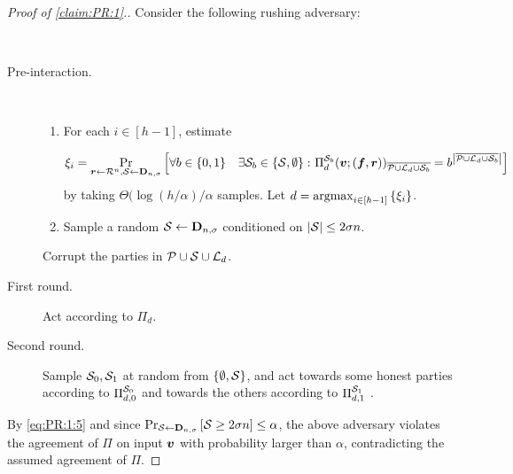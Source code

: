 \begin{proof}[Proof of \cref{claim:PR:1}.]
{\samepage
\noindent
Consider the following rushing adversary:

\begin{algorithm}[$\Ac$]~

\begin{description}
\item[Pre-interaction.] ~
		
	\begin{enumerate}
		\item For each $i\in [h-1]$, estimate
		
		\[
        \xi_i = \Pr_{{ \boldsymbol{r}}\gets \mathcal{R}^n,\mathcal{S} \gets \mathbf{D}_{n,\sigma}}\left[\forall b\in \{0,1\} \quad \exists {\cal{S}}_b \in \left\{{\cal{S}},\emptyset\right\} \colon \Pi^{{\cal{S}}_b}_{d}({ \boldsymbol{v}};({ \boldsymbol{f}},{ \boldsymbol{r}}))_{\overline{ \mathcal{P} \cup {\cal{L}}_d \cup {\cal{S}}_b}}= b^{ \left|\overline{ \mathcal{P} \cup {\cal{L}}_d \cup {\cal{S}}_b}\right|}\right]
         \]
         by taking $\Theta(\log (h/\alpha)/\alpha$ samples. Let $d = \operatorname*{argmax}_{i\in [h-1]}\left\{\xi_i\right\}$.
		
		\item Sample a random $\mathcal{S} \gets \mathbf{D}_{n,\sigma} $ conditioned on $\left|{\cal{S}}\right| \le 2\sigma n$.
	\end{enumerate}
	
	 Corrupt the parties in $\mathcal{P} \cup \mathcal{S}\cup {\cal{L}}_d$.
	
	\item[First round.] Act according to $\Pi_d$.
	
	\item[Second round.] Sample ${\cal{S}}_0,{\cal{S}}_1$ at random from $\left\{\emptyset,{\cal{S}}\right\}$, and act towards some honest parties according to $\Pi^{{\cal{S}}_0}_{d,0}$ and towards the others according to $\Pi^{{\cal{S}}_1}_{d,1}$ .
\end{description}
\end{algorithm}
}
By \cref{eq:PR:1:5} and since $\Pr_{{\cal{S}} \gets \mathbf{D}_{n,\sigma}}\left[{\cal{S}} \ge 2\sigma n\right] \le \alpha$, the above adversary violates the agreement of $\Pi$ on input ${ \boldsymbol{v}}$ with probability larger than $\alpha$, contradicting the assumed agreement of $\Pi$.
\end{proof}
